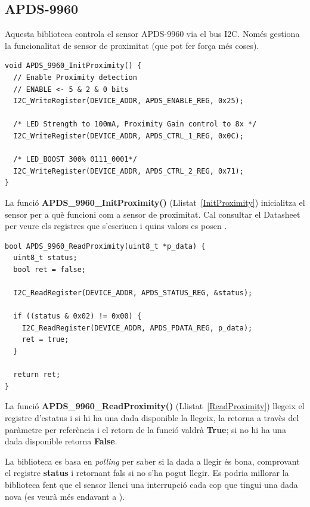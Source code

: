 \subsection{APDS-9960}
Aquesta biblioteca controla el sensor APDS-9960 via el bus \gls{I2C}. Només gestiona la funcionalitat de sensor de proximitat (que pot fer força més coses).

\begin{lstlisting}[caption={Funció {\bf APDS\_9960\_InitProximity()}},style=customc,label=InitProximity]
void APDS_9960_InitProximity() {
  // Enable Proximity detection
  // ENABLE <- 5 & 2 & 0 bits
  I2C_WriteRegister(DEVICE_ADDR, APDS_ENABLE_REG, 0x25);

  /* LED Strength to 100mA, Proximity Gain control to 8x */
  I2C_WriteRegister(DEVICE_ADDR, APDS_CTRL_1_REG, 0x0C);

  /* LED_BOOST 300% 0111_0001*/
  I2C_WriteRegister(DEVICE_ADDR, APDS_CTRL_2_REG, 0x71);
}
\end{lstlisting}

La funció {\bf APDS\_9960\_InitProximity()} (Llistat~\ref{InitProximity}) inicialitza el sensor per a què funcioni com a sensor de proximitat. Cal consultar el Datasheet per veure els registres que s'escriuen i quins valors es posen \cite{apds9960}.

\begin{lstlisting}[caption={Funció {\bf APDS\_9960\_ReadProximity()}},style=customc,label=ReadProximity]
bool APDS_9960_ReadProximity(uint8_t *p_data) {
  uint8_t status;
  bool ret = false;

  I2C_ReadRegister(DEVICE_ADDR, APDS_STATUS_REG, &status);

  if ((status & 0x02) != 0x00) {
    I2C_ReadRegister(DEVICE_ADDR, APDS_PDATA_REG, p_data);
    ret = true;
  }

  return ret;
}
\end{lstlisting}

La funció {\bf APDS\_9960\_ReadProximity()} (Llistat~\ref{ReadProximity}) llegeix el registre d'estatus i si hi ha una dada disponible la llegeix, la retorna a travès del paràmetre per referència i el retorn de la funció valdrà {\bf True}; si no hi ha una dada disponible retorna {\bf False}.

La biblioteca es basa en {\em polling} per saber si la dada a llegir és bona, comprovant el registre {\bf status} i retornant fals si no s'ha pogut llegir. Es podria millorar la biblioteca fent que el sensor llenci una interrupció cada cop que tingui una dada nova (es veurà més endavant a ).

